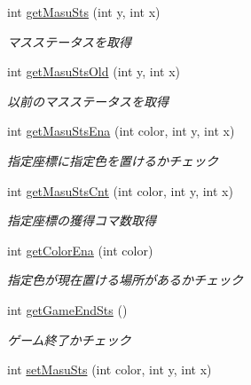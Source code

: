 \begin{DoxyCompactItemize}
int \hyperlink{classjp_1_1gr_1_1java__conf_1_1yuta__yoshinaga_1_1reversi_1_1model_1_1_reversi_aaab64f3b70ed5da5f0707933cbf82802}{get\+Masu\+Sts} (int y, int x)
\begin{DoxyCompactList}\small\item\em マスステータスを取得 \end{DoxyCompactList}\item 
int \hyperlink{classjp_1_1gr_1_1java__conf_1_1yuta__yoshinaga_1_1reversi_1_1model_1_1_reversi_a051aca9eb7ac3ce375a6c017fd0eb400}{get\+Masu\+Sts\+Old} (int y, int x)
\begin{DoxyCompactList}\small\item\em 以前のマスステータスを取得 \end{DoxyCompactList}\item 
int \hyperlink{classjp_1_1gr_1_1java__conf_1_1yuta__yoshinaga_1_1reversi_1_1model_1_1_reversi_a055f20327e781b1f6807dba0baa1e51b}{get\+Masu\+Sts\+Ena} (int color, int y, int x)
\begin{DoxyCompactList}\small\item\em 指定座標に指定色を置けるかチェック \end{DoxyCompactList}\item 
int \hyperlink{classjp_1_1gr_1_1java__conf_1_1yuta__yoshinaga_1_1reversi_1_1model_1_1_reversi_a1a528710342faba65975f4768d24b129}{get\+Masu\+Sts\+Cnt} (int color, int y, int x)
\begin{DoxyCompactList}\small\item\em 指定座標の獲得コマ数取得 \end{DoxyCompactList}\item 
int \hyperlink{classjp_1_1gr_1_1java__conf_1_1yuta__yoshinaga_1_1reversi_1_1model_1_1_reversi_ac6fafa41eeff56abfc67b2b5876b50f9}{get\+Color\+Ena} (int color)
\begin{DoxyCompactList}\small\item\em 指定色が現在置ける場所があるかチェック \end{DoxyCompactList}\item 
int \hyperlink{classjp_1_1gr_1_1java__conf_1_1yuta__yoshinaga_1_1reversi_1_1model_1_1_reversi_abc97a3ba932ee271cf04ff0f72162100}{get\+Game\+End\+Sts} ()
\begin{DoxyCompactList}\small\item\em ゲーム終了かチェック \end{DoxyCompactList}\item 
int \hyperlink{classjp_1_1gr_1_1java__conf_1_1yuta__yoshinaga_1_1reversi_1_1model_1_1_reversi_a7abf9238b933653eec2908f6e1a863db}{set\+Masu\+Sts} (int color, int y, int x)

\end{DoxyCompactItemize}
